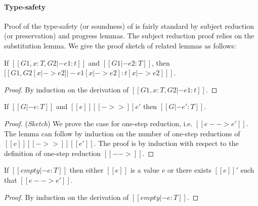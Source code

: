 \paragraph{Type-safety}
Proof of the type-safety (or soundness) of \ecore is fairly standard by subject
reduction (or preservation) and progress lemmas. The subject reduction proof
relies on the substitution lemma. We give the proof sketch of related lemmas as
follows:

\begin{lem}[Substitution]\label{lem:ecore:subst}
	If $[[G1, x:T, G2 |- e1:t]]$ and $[[G1 |- e2:T]]$, then $[[G1, G2 [x |-> e2]
|- e1[x |-> e2]  : t[x |-> e2] ]]$.
\end{lem}

\begin{proof}
    By induction on the derivation of $[[G1, x:T, G2 |- e1:t]]$.
\end{proof}

\begin{thm}\label{lem:ecore:reduct}
If $[[G |- e:T]]$ and $[[e]] [[->>]] e'$ then $[[G |- e':T]]$.
\end{thm}

\begin{proof}
    (\emph{Sketch}) We prove the case for one-step reduction, i.e. $[[e -->
e']]$. The lemma can follow by induction on the number of one-step reductions
of $[[e]] [[->>]] [[e']]$.
    The proof is by induction with respect to the definition of one-step
reduction $[[-->]]$.
\end{proof}

\begin{thm}[Progress]\label{lem:ecore:prog}
If $[[empty |- e:T]]$ then either $[[e]]$ is a value $v$ or there exists $[[e]]'$
such that $[[e --> e']]$.
\end{thm}

\begin{proof}
    By induction on the derivation of $[[empty |- e:T]]$.
\end{proof}
